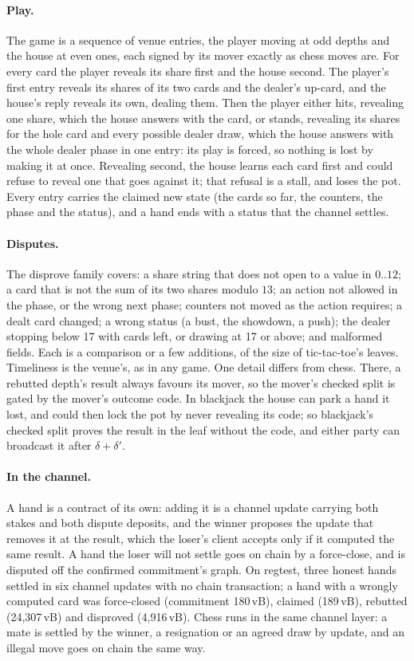 \documentclass[11pt]{article}
\begin{document}
\paragraph{Play.} The game is a sequence of venue entries, the player
moving at odd depths and the house at even ones, each signed by its
mover exactly as chess moves are. For every card the player reveals its
share first and the house second. The player's first entry reveals its
shares of its two cards and the dealer's up-card, and the house's
reply reveals its own, dealing them. Then the player either hits,
revealing one share, which the house answers with the card, or stands,
revealing its shares for the hole card and every possible dealer draw,
which the house answers with the whole dealer phase in one entry: its
play is forced, so nothing is lost by making it at once. Revealing
second, the house learns each card first and could refuse to reveal
one that goes against it; that refusal is a stall, and loses the pot.
Every entry carries the claimed new state (the cards so far, the
counters, the phase and the status), and a hand ends with a status that
the channel settles.

\paragraph{Disputes.} The disprove family covers: a share string that
does not open to a value in $0..12$; a card that is not the sum of its
two shares modulo $13$; an action not allowed in the phase, or the
wrong next phase; counters not moved as the action requires; a dealt
card changed; a wrong status (a bust, the showdown, a push); the dealer
stopping below 17 with cards left, or drawing at 17 or above; and
malformed fields. Each is a comparison or a few additions, of the size
of tic-tac-toe's leaves. Timeliness is the venue's, as in any game. One
detail differs from chess. There, a rebutted depth's result always
favours its mover, so the mover's checked split is gated by the
mover's outcome code. In blackjack the house can park a hand it lost,
and could then lock the pot by never revealing its code; so blackjack's
checked split proves the result in the leaf without the code, and
either party can broadcast it after $\delta+\delta'$.

\paragraph{In the channel.} A hand is a contract of its own: adding it
is a channel update carrying both stakes and both dispute deposits, and
the winner proposes the update that removes it at the result, which the
loser's client accepts only if it computed the same result. A hand the
loser will not settle goes on chain by a force-close, and is disputed
off the confirmed commitment's graph. On regtest, three honest hands
settled in six channel updates with no chain transaction; a hand with
a wrongly computed card was force-closed (commitment 180\,vB), claimed
(189\,vB), rebutted (24,307\,vB) and disproved (4,916\,vB). Chess runs in
the same channel layer: a mate is settled by the winner, a resignation
or an agreed draw by update, and an illegal move goes on chain the same
way.
\end{document}
